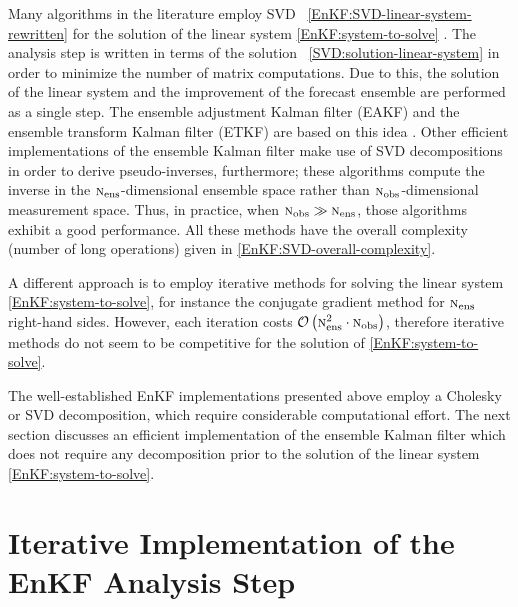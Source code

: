 \documentclass[12pt]{article}
\newcommand{\Nobs}{\textsc{n}_{{\rm obs}}}
\newcommand{\Nens}{\textsc{n}_{{\rm ens}}}
\newcommand{\BO}{{\mathcal O}}
\begin{document}
Many algorithms in the literature employ SVD ~\eqref{EnKF:SVD-linear-system-rewritten} for  the solution of the linear system \eqref{EnKF:system-to-solve} \cite{Evensen2009}. The analysis step is written in terms of the solution ~\eqref{SVD:solution-linear-system} in order to minimize the number of matrix computations. Due to this, the solution of the linear system and the improvement of the forecast ensemble are performed as a single step. The ensemble adjustment Kalman filter (EAKF) and the ensemble transform Kalman filter (ETKF) are based on this idea \cite{Tippett2003}. Other efficient implementations of the ensemble Kalman filter make use of SVD decompositions in order to derive pseudo-inverses, furthermore; these algorithms compute the inverse in the $\Nens$-dimensional ensemble space rather than $\Nobs$-dimensional measurement space. Thus, in practice, when $\Nobs \gg \Nens$, those algorithms exhibit a good performance.
All these methods have the overall complexity (number of long operations) given in  \eqref{EnKF:SVD-overall-complexity}.




A different approach is to employ iterative methods for solving the linear system \eqref{EnKF:system-to-solve}, for instance the conjugate gradient method \cite{Reid72,Golub89,Cohen72,Eis81} for $\Nens$ right-hand sides. However, each iteration costs $\BO \left( \Nens^2 \cdot \Nobs \right )$, therefore iterative methods do not seem to be competitive for the solution of \eqref{EnKF:system-to-solve}.

The well-established EnKF implementations presented above employ a Cholesky or SVD decomposition, which require considerable computational effort.
The next section discusses an efficient implementation of the ensemble Kalman filter which does not require any decomposition prior to the solution of the linear system \eqref{EnKF:system-to-solve}. 

\section{Iterative Implementation of the EnKF Analysis Step}
\label{sec:enkfSherman}
\end{document}
